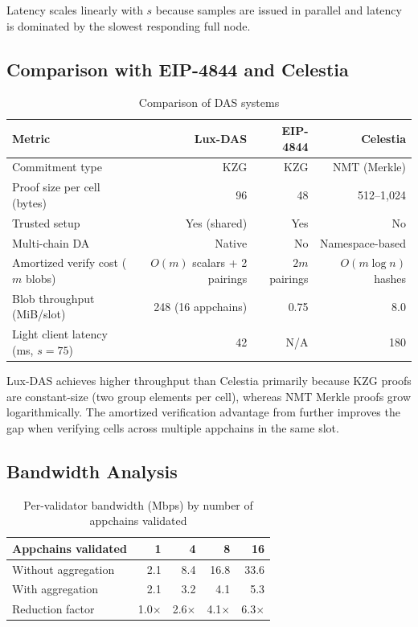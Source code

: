 Latency scales linearly with $s$ because samples are issued in parallel and latency is
dominated by the slowest responding full node.

\subsection{Comparison with EIP-4844 and Celestia}

\begin{table}[H]
\centering
\caption{Comparison of DAS systems}
\label{tab:comparison}
\begin{tabular}{lrrr}
\toprule
\textbf{Metric} & \textbf{Lux-DAS} & \textbf{EIP-4844} & \textbf{Celestia} \\
\midrule
Commitment type & KZG & KZG & NMT (Merkle) \\
Proof size per cell (bytes) & 96 & 48\footnotemark & 512--1{,}024 \\
Trusted setup & Yes (shared) & Yes & No \\
Multi-chain DA & Native & No & Namespace-based \\
Amortized verify cost ($m$ blobs) & $O(m)$ scalars + 2 pairings & $2m$ pairings & $O(m \log n)$ hashes \\
Blob throughput (MiB/slot) & 248 (16 appchains) & 0.75 & 8.0 \\
Light client latency (ms, $s=75$) & 42 & N/A\footnotemark & 180 \\
\bottomrule
\end{tabular}
\end{table}
\addtocounter{footnote}{-1}

Lux-DAS achieves higher throughput than Celestia primarily because KZG proofs are constant-size
(two group elements per cell), whereas NMT Merkle proofs grow logarithmically. The amortized
verification advantage from  further improves the gap when
verifying cells across multiple appchains in the same slot.

\subsection{Bandwidth Analysis}

\begin{table}[H]
\centering
\caption{Per-validator bandwidth (Mbps) by number of appchains validated}
\label{tab:bandwidth}
\begin{tabular}{lrrrr}
\toprule
\textbf{Appchains validated} & 1 & 4 & 8 & 16 \\
\midrule
Without aggregation & 2.1 & 8.4 & 16.8 & 33.6 \\
With aggregation & 2.1 & 3.2 & 4.1 & 5.3 \\
Reduction factor & 1.0$\times$ & 2.6$\times$ & 4.1$\times$ & 6.3$\times$ \\
\bottomrule
\end{tabular}
\end{table}

